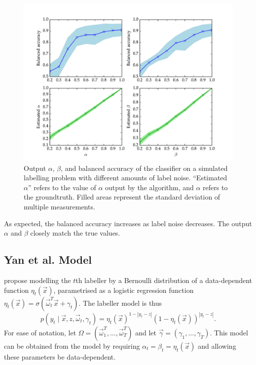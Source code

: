             \begin{figure}[!ht]
                \centering
                \includegraphics[width=\textwidth]
                    {images/experiments/raykar_noise}
                \caption{Output $\alpha$, $\beta$, and balanced accuracy of the
                    \citeauthor{raykar10} classifier on a simulated labelling
                    problem with different amounts of label noise. ``Estimated
                    $\alpha$'' refers to the value of $\alpha$ output by the
                    algorithm, and $\alpha$ refers to the groundtruth. Filled
                    areas represent the standard deviation of multiple
                    measurements.}
                \label{fig:raykar-noise}
            \end{figure}

            As expected, the balanced accuracy increases as label noise
            decreases. The output $\alpha$ and $\beta$ closely match the true
            values.

    \subsection{Yan et al. Model}
    \label{sec:yan}


        \citet{yan10} propose modelling the $t$th labeller by a Bernoulli
        distribution of a data-dependent function $\eta_t(\vec x)$, parametrised
        as a logistic regression function $\eta_t(\vec x) = \sigma(\vec
        \omega_t^T \vec x + \gamma_t)$. The labeller model is thus
        \begin{equation*}
            p(y_t \mid \vec x, z, \vec \omega_t, \gamma_t) = \eta_t(\vec x)^{1 - |y_t - z|} (1 - \eta_t(\vec x))^{|y_t - z|}.
        \end{equation*}
        For ease of notation, let $\Omega = (\vec \omega_1^T, \dots, \vec
        \omega_T^T)$ and let $\vec \gamma = (\gamma_1, \dots, \gamma_T)$. This
        model can be obtained from the \citeauthor{raykar10} model by requiring
        $\alpha_t = \beta_t = \eta_t(\vec x)$ and allowing these parameters be
        data-dependent.

